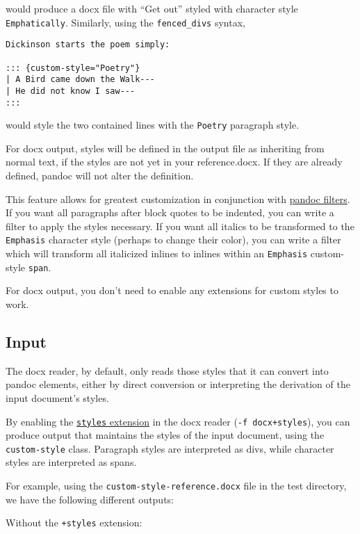 would produce a docx file with ``Get out'' styled with character style
\texttt{Emphatically}. Similarly, using the \texttt{fenced\_divs}
syntax,

\begin{verbatim}
Dickinson starts the poem simply:

::: {custom-style="Poetry"}
| A Bird came down the Walk---
| He did not know I saw---
:::
\end{verbatim}

would style the two contained lines with the \texttt{Poetry} paragraph
style.

For docx output, styles will be defined in the output file as inheriting
from normal text, if the styles are not yet in your reference.docx. If
they are already defined, pandoc will not alter the definition.

This feature allows for greatest customization in conjunction with
\href{https://pandoc.org/filters.html}{pandoc filters}. If you want all
paragraphs after block quotes to be indented, you can write a filter to
apply the styles necessary. If you want all italics to be transformed to
the \texttt{Emphasis} character style (perhaps to change their color),
you can write a filter which will transform all italicized inlines to
inlines within an \texttt{Emphasis} custom-style \texttt{span}.

For docx output, you don't need to enable any extensions for custom
styles to work.

\hypertarget{input}{%
\subsection{Input}\label{input}}

The docx reader, by default, only reads those styles that it can convert
into pandoc elements, either by direct conversion or interpreting the
derivation of the input document's styles.

By enabling the \protect\hyperlink{ext-styles}{\texttt{styles}
extension} in the docx reader (\texttt{-f\ docx+styles}), you can
produce output that maintains the styles of the input document, using
the \texttt{custom-style} class. Paragraph styles are interpreted as
divs, while character styles are interpreted as spans.

For example, using the \texttt{custom-style-reference.docx} file in the
test directory, we have the following different outputs:

Without the \texttt{+styles} extension:


